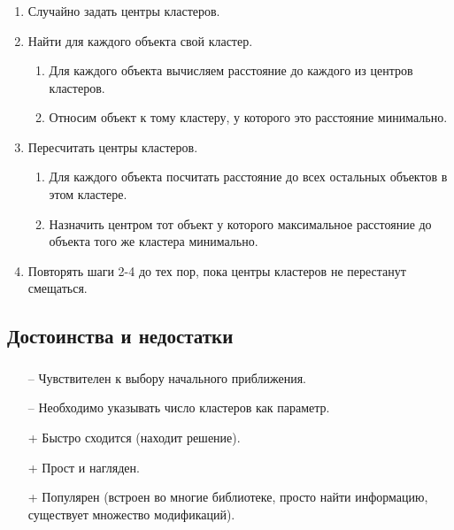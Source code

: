 \documentclass[t,aspectratio=169]{beamer}  %
\begin{document}
\begin{frame}
    \frametitle{\insertsection} 
    \framesubtitle{\insertsubsection}    
    \begin{enumerate}
        \item Случайно задать центры кластеров.
        \item Найти для каждого объекта свой кластер.
        \begin{enumerate}
            \item Для каждого объекта вычисляем расстояние до каждого из центров кластеров.
            \item Относим объект к тому кластеру, у которого это расстояние минимально.
        \end{enumerate} 
        \item Пересчитать центры кластеров.
        \begin{enumerate}
            \item Для каждого объекта посчитать расстояние до всех остальных объектов в этом кластере.
            \item Назначить центром тот объект у которого максимальное расстояние до объекта того же кластера минимально.
        \end{enumerate} 
        \item Повторять шаги 2-4 до тех пор, пока центры кластеров не перестанут смещаться.
    \end{enumerate}   
\end{frame}

\subsection{Достоинства и недостатки}

\begin{frame}
    \frametitle{\insertsection} 
    \framesubtitle{\insertsubsection}
    \begin{itemize}
        \item[--] Чувствителен к выбору начального приближения.
        \item[--] Необходимо указывать число кластеров как параметр.
        \item[+] Быстро сходится (находит решение).
        \item[+] Прост и нагляден.
        \item[+] Популярен (встроен во многие библиотеке, просто найти информацию, существует множество модификаций).
    \end{itemize}
\end{frame}
\end{document}
